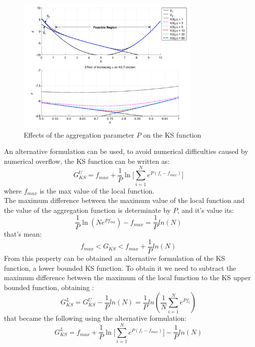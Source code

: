 \begin{figure}[H]
	\centering
	\includegraphics[width = 0.8\textwidth]{./Immagini/3_2.png}
	\caption{Effects of the aggregation parameter $P$ on the KS function}
	\label{fig:3_2}
\end{figure}
An alternative formulation can be used, to avoid numerical difficulties caused by numerical overflow, the KS function can be written as:
\begin{equation}
G_{KS}^U=f_{max}+\frac{1}{P}\ln\bigl[\sum_{i=1}^{N}e^{P(f_i-f_{max})}\bigr]
\end{equation}
where $f_{max}$ is the max value of the local function.\\
The maximum difference between the maximum value of the local function and the value of the aggregation function is determinate by $P$, and it's value its:
\begin{equation}
\frac{1}{P}\ln\left(Ne^{Pf_{ma}}\right)-f_{max}=\frac{1}{P}ln(N)
\end{equation}
that's mean:
\begin{equation}
f_{max}<G_{KS}<f_{max}+\frac{1}{P}ln(N)
\end{equation}
From this property can be obtained an alternative formulation of the KS function, a lower bounded KS function. To obtain it we need to subtract the maximum difference between the maximum of the local function to the KS upper bounded function, obtaining :
\begin{equation}
G_{KS}^L=G_{KS}^U-\frac{1}{P}ln(N)=\frac{1}{P}ln\left(\frac{1}{N}\sum_{i=1}^{N}e^{Pf_i}\right)
\end{equation}
that became the following using the alternative formulation:
\begin{equation}
G_{KS}^L=f_{max}+\frac{1}{P}\ln\bigl[\sum_{i=1}^{N}e^{P(f_i-f_{max})}\bigr]-\frac{1}{P}ln(N)
\end{equation}
